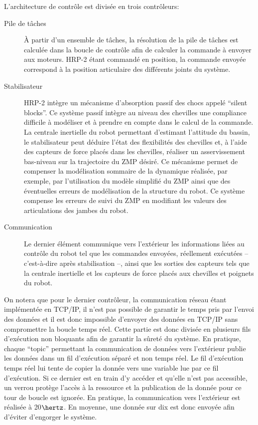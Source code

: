 L'architecture de contrôle est divisée en trois contrôleurs:
\begin{description}
\item[Pile de tâches] À partir d'un ensemble de
  tâches, la résolution de la pile de tâches est calculée dans la
  boucle de contrôle afin de calculer la commande à envoyer aux
  moteurs. HRP-2 étant commandé en position, la commande envoyée
  correspond à la position articulaire des différents joints du
  système.
\item[Stabilisateur] HRP-2 intègre un mécanisme
  d'absorption passif des chocs appelé ``silent blocks''. Ce système passif intègre au niveau des chevilles une
  compliance difficile à modéliser et à prendre en compte dans le
  calcul de la commande. La centrale inertielle du robot permettant
  d'estimant l'attitude du bassin, le stabilisateur peut déduire
  l'état des flexibilités des chevilles et, à l'aide des capteurs de
  force placés dans les chevilles, réaliser un asservissement
  bas-niveau sur la trajectoire du ZMP
  désiré. Ce mécanisme permet de compenser la modélisation sommaire de
  la dynamique réalisée, par exemple, par l'utilisation du modèle
  simplifié du ZMP ainsi que des éventuelles erreurs de modélisation
  de la structure du robot. Ce système compense les erreurs de suivi
  du ZMP en modifiant les valeurs des articulations des jambes du
  robot.
\item[Communication] Le dernier élément communique vers l'extérieur
  les informations liées au contrôle du robot tel que les commandes
  envoyées, réellement exécutées -- c'est-à-dire après stabilisation
  --, ainsi que les sorties des capteurs tels que la centrale
  inertielle et les capteurs de force placés aux chevilles et poignets
  du robot.
\end{description}


On notera que pour le dernier contrôleur, la communication réseau
étant implémentée en TCP/IP, il n'est pas possible de
garantir le temps pris par l'envoi des données et il est donc
impossible d'envoyer des données en TCP/IP sans
compromettre la boucle temps réel. Cette partie est donc divisée en
plusieurs fils d'exécution non bloquants afin de garantir la sûreté du
système. En pratique, chaque ``topic'' permettant la communication de
données vers l'extérieur publie les données dans un fil d'exécution
séparé et non temps réel. Le fil d'exécution
temps réel lui tente de copier la donnée vers une variable lue par ce
fil d'exécution. Si ce dernier est en train d'y accéder et qu'elle
n'est pas accessible, un verrou protège l'accès à la ressource et la
publication de la donnée pour ce tour de boucle est ignorée. En
pratique, la communication vers l'extérieur est réalisée à 20$\hertz$. En
moyenne, une donnée sur dix est donc envoyée afin d'éviter d'engorger
le système.


